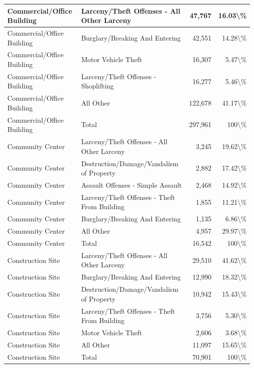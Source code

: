 \documentclass[
]{krantz}
\begin{document}
\begin{longtable}[t]{l|l|r|r}
Commercial/Office Building & Larceny/Theft Offenses - All Other Larceny & 47,767 & 16.03\textbackslash{}\%\\
\hline
Commercial/Office Building & Burglary/Breaking And Entering & 42,551 & 14.28\textbackslash{}\%\\
\hline
Commercial/Office Building & Motor Vehicle Theft & 16,307 & 5.47\textbackslash{}\%\\
\hline
Commercial/Office Building & Larceny/Theft Offenses - Shoplifting & 16,277 & 5.46\textbackslash{}\%\\
\hline
Commercial/Office Building & All Other & 122,678 & 41.17\textbackslash{}\%\\
\hline
Commercial/Office Building & Total & 297,961 & 100\textbackslash{}\%\\
\hline
Community Center & Larceny/Theft Offenses - All Other Larceny & 3,245 & 19.62\textbackslash{}\%\\
\hline
Community Center & Destruction/Damage/Vandalism of Property & 2,882 & 17.42\textbackslash{}\%\\
\hline
Community Center & Assault Offenses - Simple Assault & 2,468 & 14.92\textbackslash{}\%\\
\hline
Community Center & Larceny/Theft Offenses - Theft From Building & 1,855 & 11.21\textbackslash{}\%\\
\hline
Community Center & Burglary/Breaking And Entering & 1,135 & 6.86\textbackslash{}\%\\
\hline
Community Center & All Other & 4,957 & 29.97\textbackslash{}\%\\
\hline
Community Center & Total & 16,542 & 100\textbackslash{}\%\\
\hline
Construction Site & Larceny/Theft Offenses - All Other Larceny & 29,510 & 41.62\textbackslash{}\%\\
\hline
Construction Site & Burglary/Breaking And Entering & 12,990 & 18.32\textbackslash{}\%\\
\hline
Construction Site & Destruction/Damage/Vandalism of Property & 10,942 & 15.43\textbackslash{}\%\\
\hline
Construction Site & Larceny/Theft Offenses - Theft From Building & 3,756 & 5.30\textbackslash{}\%\\
\hline
Construction Site & Motor Vehicle Theft & 2,606 & 3.68\textbackslash{}\%\\
\hline
Construction Site & All Other & 11,097 & 15.65\textbackslash{}\%\\
\hline
Construction Site & Total & 70,901 & 100\textbackslash{}\%\\

\end{longtable}
\end{document}
